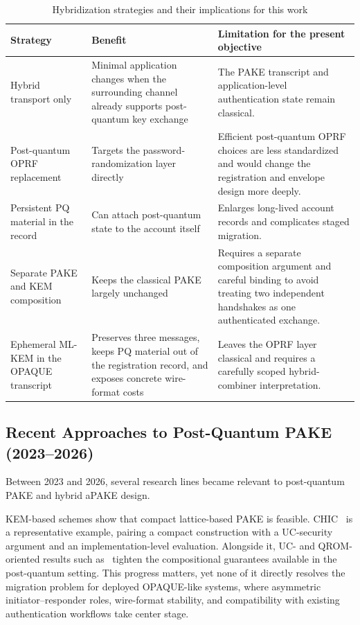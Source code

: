 \documentclass{ieeeijc}
\theoremstyle{remark}
\begin{document}
\begin{table}[t]
\caption{Hybridization strategies and their implications for this work}
\label{tab:design-alternatives}
\centering\scriptsize
\begin{tabularx}{\textwidth}{@{}L{3.2cm}L{4.5cm}X@{}}
\toprule
Strategy & Benefit & Limitation for the present objective \\
\midrule
Hybrid transport only & Minimal application changes when the surrounding
channel already supports post-quantum key exchange & The PAKE transcript
and application-level authentication state remain classical. \\
Post-quantum OPRF replacement & Targets the password-randomization layer
directly & Efficient post-quantum OPRF choices are less standardized and
would change the registration and envelope design more deeply. \\
Persistent PQ material in the record & Can attach post-quantum state to
the account itself & Enlarges long-lived account records and complicates
staged migration. \\
Separate PAKE and KEM composition & Keeps the classical PAKE largely
unchanged & Requires a separate composition argument and careful binding
to avoid treating two independent handshakes as one authenticated
exchange. \\
Ephemeral ML-KEM in the OPAQUE transcript & Preserves three messages,
keeps PQ material out of the registration record, and exposes concrete
wire-format costs & Leaves the OPRF layer classical and requires a
carefully scoped hybrid-combiner interpretation. \\
\bottomrule
\end{tabularx}
\end{table}

\subsection{Recent Approaches to Post-Quantum PAKE (2023--2026)}

Between 2023 and 2026, several research lines became relevant to
post-quantum PAKE and hybrid aPAKE design.

KEM-based schemes show that compact lattice-based PAKE is feasible.
CHIC~\cite{arriaga2024} is a representative example, pairing a compact
construction with a UC-security argument and an implementation-level
evaluation. Alongside it, UC- and QROM-oriented results such
as~\cite{lyu2024uc} tighten the compositional guarantees available in
the post-quantum setting. This progress matters, yet none of it directly
resolves the migration problem for deployed OPAQUE-like systems, where
asymmetric initiator--responder roles, wire-format stability, and
compatibility with existing authentication workflows take center stage.
\end{document}
